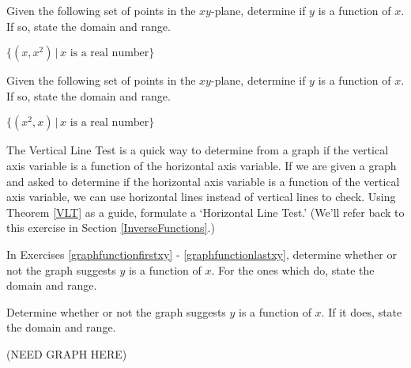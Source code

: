 \documentclass{ximera}
\begin{document}





\begin{problem}
  Given the following set of points in the $xy$-plane, determine if $y$ is a function of $x$.  If so, state the domain and range.  

$\{ \left(x,x^2\right) \, | \, \text{$x$ is a real number} \}$
\end{problem}    

\begin{problem}\label{setfunctionlast}
  Given the following set of points in the $xy$-plane, determine if $y$ is a function of $x$.  If so, state the domain and range.  

$\{ \left(x^2,x\right) \, | \, \text{$x$ is a real number} \}$
\end{problem}     



\begin{problem}\label{HLTExercise} The Vertical Line Test is a quick way to determine from a graph if the vertical axis variable is a function of the horizontal axis variable. If we are given a graph and asked to determine if the horizontal axis variable is a function of the vertical axis variable, we can use horizontal lines instead of vertical lines to check.  Using Theorem \ref{VLT} as a guide,  formulate a `Horizontal Line Test.'  (We'll refer back to this exercise in Section \ref{InverseFunctions}.)
\end{problem}



 


In Exercises \ref{graphfunctionfirstxy} - \ref{graphfunctionlastxy}, determine whether or not the graph suggests $y$ is a function of $x$.  For the ones which do, state the domain and range. 


\begin{problem}\label{graphfunctionfirstxy}
    Determine whether or not the graph suggests $y$ is a function of $x$.  If it does, state the domain and range.

    (NEED GRAPH HERE)
\end{problem}

\end{document}
